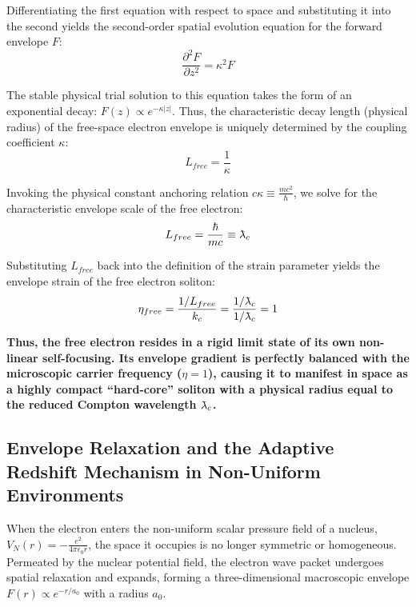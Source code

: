 \documentclass[12pt, a4paper]{article}
\newcommand{\lambdabar}{{\mkern0.75mu\mathchar '26\mkern -9.75mu\lambda}}
\begin{document}
Differentiating the first equation with respect to space and substituting it into the second yields the second-order spatial evolution equation for the forward envelope $F$:
\begin{equation}
    \frac{\partial^2 F}{\partial z^2} = \kappa^2 F 
\end{equation}

The stable physical trial solution to this equation takes the form of an exponential decay: $F(z) \propto e^{-\kappa |z|}$. Thus, the characteristic decay length (physical radius) of the free-space electron envelope is uniquely determined by the coupling coefficient $\kappa$:
\begin{equation}
    L_{free} = \frac{1}{\kappa} 
\end{equation}

Invoking the physical constant anchoring relation $c\kappa \equiv \frac{mc^2}{\hbar}$, we solve for the characteristic envelope scale of the free electron:
\begin{equation}
    L_{free} = \frac{\hbar}{mc} \equiv \lambdabar_c 
\end{equation}

Substituting $L_{free}$ back into the definition of the strain parameter yields the envelope strain of the free electron soliton:
\begin{equation}
    \eta_{free} = \frac{1/L_{free}}{k_c} = \frac{1/\lambdabar_c}{1/\lambdabar_c} = 1 
\end{equation}

\textbf{Thus, the free electron resides in a rigid limit state of its own non-linear self-focusing. Its envelope gradient is perfectly balanced with the microscopic carrier frequency ($\eta = 1$), causing it to manifest in space as a highly compact ``hard-core'' soliton with a physical radius equal to the reduced Compton wavelength $\lambdabar_c$.}

\subsection{Envelope Relaxation and the Adaptive Redshift Mechanism in Non-Uniform Environments}

When the electron enters the non-uniform scalar pressure field of a nucleus, $V_N(r) = - \frac{e^2}{4\pi\epsilon_0 r}$, the space it occupies is no longer symmetric or homogeneous. Permeated by the nuclear potential field, the electron wave packet undergoes spatial relaxation and expands, forming a three-dimensional macroscopic envelope $F(r) \propto e^{-r/a_0}$ with a radius $a_0$.
\end{document}
